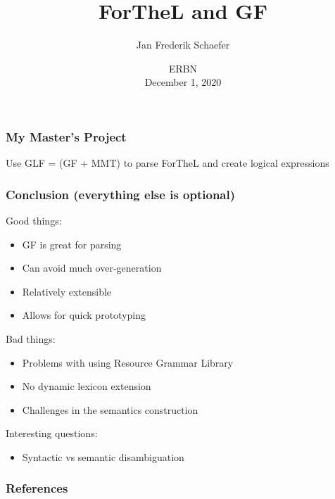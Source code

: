 \documentclass[aspectratio=149]{beamer}
\title{ForTheL and GF}
\author{Jan Frederik Schaefer}
\institute{FAU Erlangen-N\"urnberg}
\date{ERBN \\ December 1, 2020 }
\begin{document}
\frame\titlepage





\begin{frame}
    \frametitle{My Master's Project}
    Use GLF = (GF + MMT) to parse ForTheL and create logical expressions

    \vspace{2em}

    
\end{frame}


\begin{frame}
    \frametitle{Conclusion (everything else is optional)}
    Good things:
    \begin{itemize}
        \item GF is great for parsing
        \item Can avoid much over-generation
        \item Relatively extensible
        \item Allows for quick prototyping
    \end{itemize}

    Bad things:
    \begin{itemize}
        \item Problems with using Resource Grammar Library
        \item No dynamic lexicon extension
        \item Challenges in the semantics construction
    \end{itemize}

    Interesting questions:
    \begin{itemize}
        \item Syntactic vs semantic disambiguation
    \end{itemize}
\end{frame}








% 




\appendix

\begin{frame}[allowframebreaks,t]
    \frametitle{References}
    \printbibliography
\end{frame}
\end{document}
